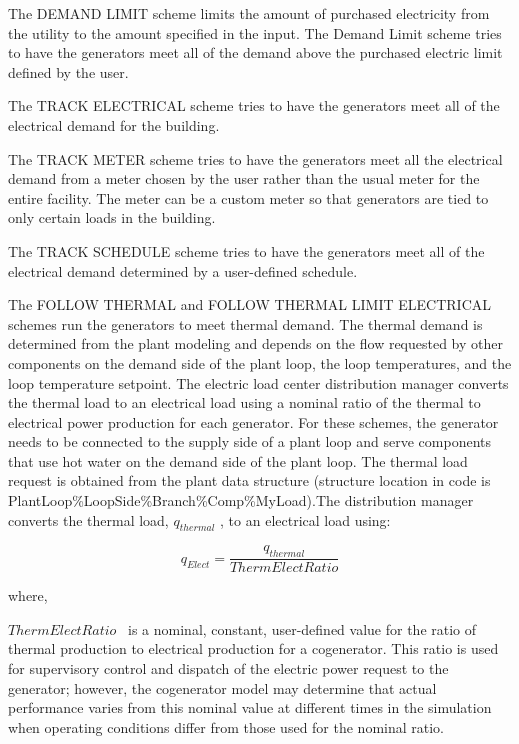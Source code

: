 The DEMAND LIMIT scheme limits the amount of purchased electricity from the utility to the amount specified in the input. The Demand Limit scheme tries to have the generators meet all of the demand above the purchased electric limit defined by the user.

The TRACK ELECTRICAL scheme tries to have the generators meet all of the electrical demand for the building.

The TRACK METER scheme tries to have the generators meet all the electrical demand from a meter chosen by the user rather than the usual meter for the entire facility. The meter can be a custom meter so that generators are tied to only certain loads in the building.

The TRACK SCHEDULE scheme tries to have the generators meet all of the electrical demand determined by a user-defined schedule.

The FOLLOW THERMAL and FOLLOW THERMAL LIMIT ELECTRICAL schemes run the generators to meet thermal demand. The thermal demand is determined from the plant modeling and depends on the flow requested by other components on the demand side of the plant loop, the loop temperatures, and the loop temperature setpoint. The electric load center distribution manager converts the thermal load to an electrical load using a nominal ratio of the thermal to electrical power production for each generator. For these schemes, the generator needs to be connected to the supply side of a plant loop and serve components that use hot water on the demand side of the plant loop. The thermal load request is obtained from the plant data structure (structure location in code is PlantLoop\%LoopSide\%Branch\%Comp\%MyLoad).The distribution manager converts the thermal load, \({q_{thermal}}\) , to an electrical load using:

\begin{equation}
{q_{Elect}} = \frac{{{q_{thermal}}}}{{ThermElectRatio}}
\end{equation}

where,

\(ThermElectRatio\) ~is a nominal, constant, user-defined value for the ratio of thermal production to electrical production for a cogenerator. This ratio is used for supervisory control and dispatch of the electric power request to the generator; however, the cogenerator model may determine that actual performance varies from this nominal value at different times in the simulation when operating conditions differ from those used for the nominal ratio.

